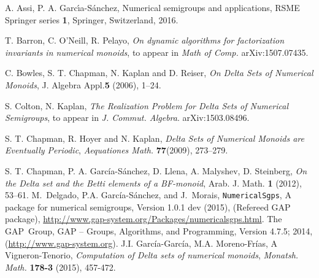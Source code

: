 \documentclass[11pt]{amsart}
\theoremstyle{remark}
\begin{document}
\begin{thebibliography}{99}%

%

 A. Assi, P. A. Garc\'{\i}a-S\'anchez, Numerical semigroups and applications, RSME Springer series \textbf{1}, Springer, Switzerland, 2016.

 T. Barron, C. O'Neill, R. Pelayo, \emph{On dynamic algorithms for factorization invariants in numerical monoids}, to appear in \textit{Math of Comp.} arXiv:1507.07435.

 C. Bowles, S. T. Chapman, N. Kaplan and D. Reiser, \textit{On Delta Sets of Numerical Monoids}, J. Algebra Appl.\textbf{5} (2006), 1--24.

 S. Colton, N. Kaplan, \emph{The Realization Problem for Delta Sets of Numerical Semigroups}, to appear in \textit{J. Commut. Algebra}. arXiv:1503.08496.

 S. T. Chapman, R. Hoyer and N. Kaplan, \emph{Delta Sets of Numerical Monoids are Eventually Periodic},
 \textit{Aequationes Math.} \textbf{77}(2009), 273--279.
 
%
%
 S. T. Chapman, P. A. Garc\'ia-S\'anchez, D. Llena, A. Malyshev, D. Steinberg, \textit{On the Delta set and the Betti elements of a BF-monoid},  Arab. J. Math. \textbf{1} (2012), 53--61.
 M.~Delgado, P.A. Garc{\'i}a-S{\'a}nchez, and J.~Morais, \texttt{NumericalSgps}, A
package  for  numerical  semigroups, Version 1.0.1 dev (2015), (Refereed GAP
package), \url{http://www.gap-system.org/Packages/numericalsgps.html}.
%
The GAP~Group, GAP -- Groups, Algorithms, and Programming, Version 4.7.5; 
2014, (\url{http://www.gap-system.org}).
%
 J.I. Garc\'ia-Garc\'ia, M.A. Moreno-Fr\'ias, A Vigneron-Tenorio, \emph{Computation of Delta sets of numerical monoids},   \textit{Monatsh. Math.} \textbf{178-3} (2015), 457-472.
%


\end{thebibliography}
\end{document}
